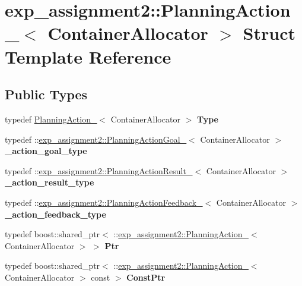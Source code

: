 \hypertarget{structexp__assignment2_1_1PlanningAction__}{}\section{exp\+\_\+assignment2\+:\+:Planning\+Action\+\_\+$<$ Container\+Allocator $>$ Struct Template Reference}
\label{structexp__assignment2_1_1PlanningAction__}
\subsection*{Public Types}
\begin{DoxyCompactItemize}
\item 
\mbox{\label{structexp__assignment2_1_1PlanningAction___a55b4a69cc92a9a42c079e0d714eb437f}} 
typedef \hyperlink{structexp__assignment2_1_1PlanningAction__}{Planning\+Action\+\_\+}$<$ Container\+Allocator $>$ {\bfseries Type}
\item 
\mbox{\label{structexp__assignment2_1_1PlanningAction___a45ebb2419ff46b4ce9359f11f2edf57b}} 
typedef \+::\hyperlink{structexp__assignment2_1_1PlanningActionGoal__}{exp\+\_\+assignment2\+::\+Planning\+Action\+Goal\+\_\+}$<$ Container\+Allocator $>$ {\bfseries \+\_\+action\+\_\+goal\+\_\+type}
\item 
\mbox{\label{structexp__assignment2_1_1PlanningAction___a5f527edf75e3cd28f856a42af7eda6fc}} 
typedef \+::\hyperlink{structexp__assignment2_1_1PlanningActionResult__}{exp\+\_\+assignment2\+::\+Planning\+Action\+Result\+\_\+}$<$ Container\+Allocator $>$ {\bfseries \+\_\+action\+\_\+result\+\_\+type}
\item 
\mbox{\label{structexp__assignment2_1_1PlanningAction___ad30481f35d48a81097bf81b896304585}} 
typedef \+::\hyperlink{structexp__assignment2_1_1PlanningActionFeedback__}{exp\+\_\+assignment2\+::\+Planning\+Action\+Feedback\+\_\+}$<$ Container\+Allocator $>$ {\bfseries \+\_\+action\+\_\+feedback\+\_\+type}
\item 
\mbox{\label{structexp__assignment2_1_1PlanningAction___a50ddd57e702e7ed5cea834d68543b6d5}} 
typedef boost\+::shared\+\_\+ptr$<$ \+::\hyperlink{structexp__assignment2_1_1PlanningAction__}{exp\+\_\+assignment2\+::\+Planning\+Action\+\_\+}$<$ Container\+Allocator $>$ $>$ {\bfseries Ptr}
\item 
\mbox{\label{structexp__assignment2_1_1PlanningAction___a0436ab0cf0080c021d1faae1a7f01604}} 
typedef boost\+::shared\+\_\+ptr$<$ \+::\hyperlink{structexp__assignment2_1_1PlanningAction__}{exp\+\_\+assignment2\+::\+Planning\+Action\+\_\+}$<$ Container\+Allocator $>$ const  $>$ {\bfseries Const\+Ptr}
\end{DoxyCompactItemize}
